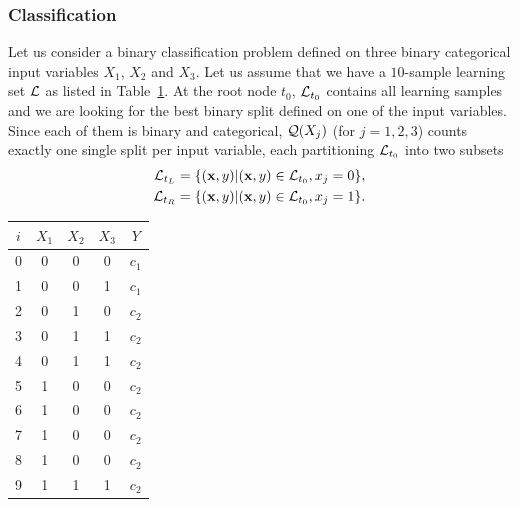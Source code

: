 \subsubsection{Classification}
\label{sec:3:criteria:classification}

Let us consider a binary classification problem defined on three binary
categorical input variables $X_1$, $X_2$ and $X_3$. Let us assume that we have
a $10$-sample learning set ${\cal L}$ as listed in Table~\ref{table:toy-problem}.
At the root node $t_0$, ${\cal L}_{t_0}$ contains all learning
samples and we are looking for the best binary split defined on one of the input
variables. Since each of them is binary and categorical, ${\cal Q}(X_j)$ (for $j=1, 2, 3$)
counts exactly one single split per input variable, each partitioning ${\cal L}_{t_0}$
into two subsets
\begin{align*}
{\cal L}_{t_L} &= \{(\mathbf{x}, y) | (\mathbf{x}, y) \in {\cal L}_{t_0}, x_j = 0\}, \\
{\cal L}_{t_R} &= \{(\mathbf{x}, y) | (\mathbf{x}, y) \in {\cal L}_{t_0}, x_j = 1\}.
\end{align*}

\begin{table}
    \centering
    \begin{tabular}{| c | c c c | c |}
    \hline
        $i$ & \textbf{$X_1$} & \textbf{$X_2$} & \textbf{$X_3$} & \textbf{$Y$} \\
    \hline
    \hline
    0 & 0 & 0 & 0 & $c_1$ \\
    1 & 0 & 0 & 1 & $c_1$ \\
    2 & 0 & 1 & 0 & $c_2$ \\
    3 & 0 & 1 & 1 & $c_2$ \\
    4 & 0 & 1 & 1 & $c_2$ \\
    5 & 1 & 0 & 0 & $c_2$ \\
    6 & 1 & 0 & 0 & $c_2$ \\
    7 & 1 & 0 & 0 & $c_2$ \\
    8 & 1 & 0 & 0 & $c_2$ \\
    9 & 1 & 1 & 1 & $c_2$ \\
    \hline
    \end{tabular}
    \label{table:toy-problem}
\end{table}

